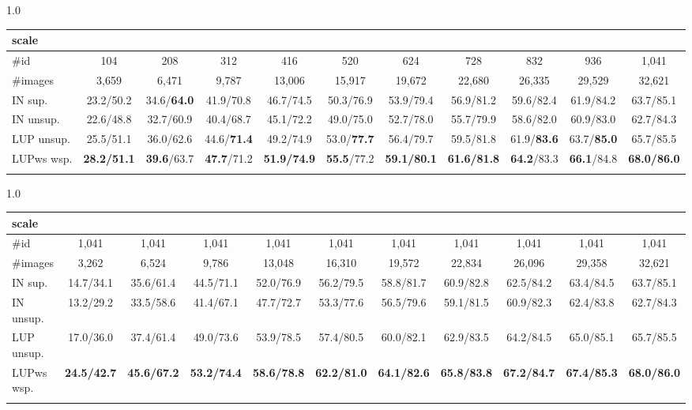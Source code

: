 \documentclass[10pt,twocolumn,letterpaper]{article}
\begin{document}
\begin{table*}[h]
	\begin{subtable}[h]{1.0\textwidth}
		\centering
		\begin{tabular}{l|cccccccccc}
			\shline
			scale &  &  &  &  &  &  &  &  &  &  \\
			\hline
			\#id & 104 & 208 & 312 & 416 & 520 & 624 & 728 & 832 & 936 & 1,041 \\ 
			\#images & 3,659 & 6,471 & 9,787 & 13,006 & 15,917 & 19,672 & 22,680 & 26,335 & 29,529 & 32,621 \\
			\hline
			IN sup.   & 23.2/50.2 & 34.6/\textbf{64.0} & 41.9/70.8 & 46.7/74.5 & 50.3/76.9 & 53.9/79.4 & 56.9/81.2 & 59.6/82.4 & 61.9/84.2 & 63.7/85.1 \\
			IN unsup. & 22.6/48.8 & 32.7/60.9 & 40.4/68.7 & 45.1/72.2 & 49.0/75.0 & 52.7/78.0 & 55.7/79.9 & 58.6/82.0 & 60.9/83.0 & 62.7/84.3 \\
			LUP unsup.& 25.5/51.1 & 36.0/62.6 & 44.6/\textbf{71.4} & 49.2/74.9 & 53.0/\textbf{77.7} & 56.4/79.7 & 59.5/81.8 & 61.9/\textbf{83.6} & 63.7/\textbf{85.0} & 65.7/85.5 \\
			\hline
			LUPws wsp.& \textbf{28.2/51.1} & \textbf{39.6}/63.7 & \textbf{47.7}/71.2 & \textbf{51.9/74.9} & \textbf{55.5}/77.2 & \textbf{59.1/80.1} & \textbf{61.6/81.8} & \textbf{64.2}/83.3 & \textbf{66.1}/84.8 & \textbf{68.0/86.0} \\
			\shline
		\end{tabular}
		\vspace{-0.12cm}
		\caption{MSMT17 small-scale}
		\label{tab:ss-msmt}
	\end{subtable}
	
	\begin{subtable}[h]{1.0\textwidth}
		\centering
		\begin{tabular}{l|cccccccccc}
			\shline
			scale &  &  &  &  &  &  &  &  &  &  \\
			\hline
			\#id & 1,041 & 1,041 & 1,041 & 1,041 & 1,041 & 1,041 & 1,041 & 1,041 & 1,041 & 1,041 \\
			\#images & 3,262 & 6,524 & 9,786 & 13,048 & 16,310 & 19,572 & 22,834 & 26,096 & 29,358 & 32,621 \\
			\hline
			IN sup.   & 14.7/34.1 & 35.6/61.4 & 44.5/71.1 & 52.0/76.9 & 56.2/79.5 & 58.8/81.7 & 60.9/82.8 & 62.5/84.2 & 63.4/84.5 & 63.7/85.1 \\
			IN unsup. & 13.2/29.2 & 33.5/58.6 & 41.4/67.1 & 47.7/72.7 & 53.3/77.6 & 56.5/79.6 & 59.1/81.5 & 60.9/82.3 & 62.4/83.8 & 62.7/84.3 \\
			LUP unsup.& 17.0/36.0 & 37.4/61.4 & 49.0/73.6 & 53.9/78.5 & 57.4/80.5 & 60.0/82.1 & 62.9/83.5 & 64.2/84.5 & 65.0/85.1 & 65.7/85.5 \\
			\hline
			LUPws wsp.& \textbf{24.5/42.7} & \textbf{45.6/67.2} & \textbf{53.2/74.4} & \textbf{58.6/78.8} & \textbf{62.2/81.0} & \textbf{64.1/82.6} & \textbf{65.8/83.8} & \textbf{67.2/84.7} & \textbf{67.4/85.3} & \textbf{68.0/86.0} \\
			\shline
		\end{tabular}
		\vspace{-0.12cm}
		\caption{MSMT17 few-shot}
		\label{tab:fs-msmt}
	\end{subtable}
	

\end{table*}
\end{document}
